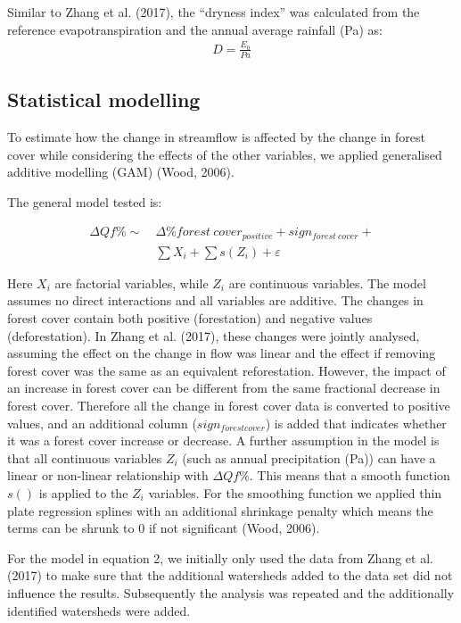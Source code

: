 \documentclass[]{elsarticle} %
\begin{document}
Similar to Zhang et al. (2017), the ``dryness index'' was calculated from the reference evapotranspiration and the annual average rainfall (Pa) as:
\[\tag{1}
\begin{aligned}
D = \frac{E_{0}}{Pa}
\end{aligned}\]

\hypertarget{statistical-modelling}{%
\subsection{Statistical modelling}\label{statistical-modelling}}

To estimate how the change in streamflow is affected by the change in forest cover while considering the effects of the other variables, we applied generalised additive modelling (GAM) (Wood, 2006).

The general model tested is:

\[\tag{2}
\begin{aligned}
\Delta Qf \% \sim ~ &\Delta \% forest~cover_{positive} + sign_{forest~cover} + \\ & \sum{X_i} + \sum{s(Z_i)} + \varepsilon
\end{aligned}\]

Here \(X_i\) are factorial variables, while \(Z_i\) are continuous variables. The model assumes no direct interactions and all variables are additive. The changes in forest cover contain both positive (forestation) and negative values (deforestation). In Zhang et al. (2017), these changes were jointly analysed, assuming the effect on the change in flow was linear and the effect if removing forest cover was the same as an equivalent reforestation. However, the impact of an increase in forest cover can be different from the same fractional decrease in forest cover. Therefore all the change in forest cover data is converted to positive values, and an additional column (\(sign_{forest cover}\)) is added that indicates whether it was a forest cover increase or decrease.
A further assumption in the model is that all continuous variables \(Z_i\) (such as annual precipitation (Pa)) can have a linear or non-linear relationship with \(\Delta Qf \%\). This means that a smooth function \(s()\) is applied to the \(Z_i\) variables. For the smoothing function we applied thin plate regression splines with an additional shrinkage penalty which means the terms can be shrunk to 0 if not significant (Wood, 2006).

For the model in equation 2, we initially only used the data from Zhang et al. (2017) to make sure that the additional watersheds added to the data set did not influence the results. Subsequently the analysis was repeated and the additionally identified watersheds were added.
\end{document}
